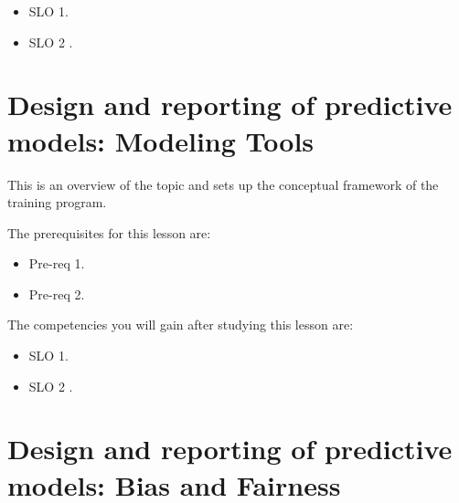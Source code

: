 \begin{itemize}
    \item SLO 1.
\end{itemize}

\begin{itemize}
    \item SLO 2 .
\end{itemize}

\section{Design and reporting of predictive models: Modeling Tools}
\label{sec:design-and-reporting-of-predictive-models-modeling-tools}

This is an overview of the topic and sets up the conceptual framework of the training program.




The prerequisites for this lesson are: 




\begin{itemize}
    \item Pre-req 1.
\end{itemize}

\begin{itemize}
    \item Pre-req 2.
\end{itemize}




The competencies you will gain after studying this lesson are: 




\begin{itemize}
    \item SLO 1.
\end{itemize}

\begin{itemize}
    \item SLO 2 .
\end{itemize}

\section{Design and reporting of predictive models: Bias and Fairness}
\label{sec:design-and-reporting-of-predictive-models-bias-and-fairness}

